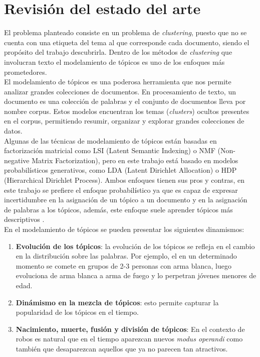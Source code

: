 \documentclass[letterpaper,12pt,oneside]{book} %
\begin{document}
\section{Revisión del estado del arte}

El problema planteado consiste en un problema de \textit{clustering}, puesto que no se cuenta con una etiqueta del tema al que corresponde cada documento, siendo el propósito del trabajo descubrirla. Dentro de los métodos de \textit{clustering} que involucran texto el modelamiento de tópicos es uno de los enfoques más prometedores.\\

El modelamiento de tópicos es una poderosa herramienta que nos permite analizar grandes colecciones de documentos. En procesamiento de texto, un documento es una colección de palabras y el conjunto de documentos lleva por nombre corpus. Estos modelos encuentran los temas (\textit{clusters}) ocultos presentes en el corpus, permitiendo resumir, organizar y explorar grandes colecciones de datos.\\

Algunas de las técnicas de modelamiento de tópicos están basadas en factorización matricial como LSI (Latent Semantic Indexing) \citep{dumais2004latent} o NMF (Non-negative Matrix Factorization)\citep{xu2003document}, pero en este trabajo está basado en modelos probabilísticos generativos, como LDA (Latent Dirichlet Allocation)\citep{blei2003latent} o HDP (Hierarchical Dirichlet Process)\citep{teh2005sharing}. Ambos enfoques tienen sus pros y contras, en este trabajo se prefiere el enfoque probabilístico ya que es capaz de expresar incertidumbre en la asignación de un tópico a un documento y en la asignación de palabras a los tópicos, además, este enfoque suele aprender tópicos más descriptivos \citep{stevens2012exploring}.\\

En el modelamiento de tópicos se pueden presentar los siguientes dinamismos:
\begin{enumerate}
    \item \textbf{Evolución de los tópicos}: la evolución de los tópicos se refleja en el cambio en la distribución sobre las palabras. Por ejemplo, el  en un determinado momento se comete en grupos de 2-3 personas con arma blanca, luego evoluciona de arma blanca a arma de fuego y lo perpetran jóvenes menores de edad.
    \item \textbf{Dinámismo en la mezcla de tópicos}: esto permite capturar la popularidad de los tópicos en el tiempo.
    \item \textbf{Nacimiento, muerte, fusión y división de tópicos}: En el contexto de robos es natural que en el tiempo aparezcan nuevos \textit{modus operandi} como también que desaparezcan aquellos que ya no parecen tan atractivos.
\end{enumerate}
\end{document}

